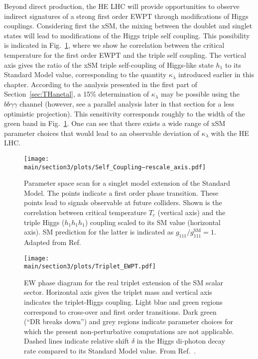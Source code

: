 Beyond direct production, the HE LHC will provide opportunities to observe indirect signatures of a strong first order EWPT through modifications of Higgs couplings. Considering first the xSM, the mixing between the doublet and singlet states will lead to modifications of the Higgs triple self coupling. This possibility is indicated in Fig.~\ref{fig:ewpt_self}, where we show he correlation between the critical temperature for the first order EWPT and the triple self coupling. The vertical axis gives the ratio of the xSM triple self-coupling of Higgs-like state $h_1$ to its Standard Model value, corresponding to the quantity $\kappa_\lambda$  introduced earlier in this chapter.  According to the analysis presented in the first part of Section~\ref{sec:THanetal}, a 15\% determination of $\kappa_\lambda$ may be possible using the $bb\gamma\gamma$ channel (however, see a parallel analysis later in that section for a less optimistic projection). This sensitivity corresponds roughly to the width of the green band in Fig.~\ref{fig:ewpt_self}. One can see that there exists a wide range of xSM parameter choices that would lead to an observable deviation of $\kappa_\lambda$ with the HE LHC.

\begin{figure}[hbtp]
  \begin{center}
    \texttt{[image: \\main/section3/plots/Self\_Coupling--rescale\_axis.pdf]}
    \caption{
    Parameter space scan for a singlet model extension of the Standard Model. The points indicate a first order phase transition. These points lead to signals observable at future colliders. Shown is the correlation between critical temperature $T_c$ (vertical axis) and the triple Higgs ($h_1 h_1 h_1$) coupling scaled to its SM value (horizontal axis). SM prediction for the latter is indicated as $g_{111}/g_{111}^\mathrm{SM}=1$. Adapted from Ref.~\cite{Profumo:2014opa}   
        }
    \label{fig:ewpt_self}
  \end{center}
\end{figure}

\begin{figure}[hbtp]
  \begin{center}
  \texttt{[image: \\main/section3/plots/Triplet\_EWPT.pdf]}
    \caption{
    EW phase diagram for the real triplet extension of the SM scalar sector. Horizontal axis gives the triplet mass and vertical axis indicates the triplet-Higgs coupling. Light blue and green regions correspond to cross-over and first order transitions. Dark green (``DR breaks down'') and grey regions indicate parameter choices for which the present non-perturbative computations are not applicable. Dashed lines indicate relative shift $\delta$ in the Higgs di-photon decay rate compared to its Standard Model value. From Ref.~\cite{Niemi:2018asa}.    
        }
    \label{fig:ewpt_triplet}
  \end{center}
\end{figure}

